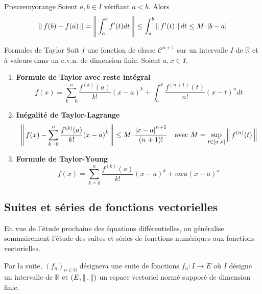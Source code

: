     \begin{demo}{Preuve}{myorange}
        Soient $a,b \in I$ vérifiant $a < b$. Alors 
        \[ \left\lVert\,f(b) - f(a)\,\right\rVert = \left\lVert\,\int_{a}^{b} f'(t)dt\,\right\rVert \leq \int_{a}^{b} \left\lVert\,f'(t)\,\right\rVert dt \leq M \cdotp \left\lvert b-a\right\rvert \]
    \end{demo}

    \begin{theo}{Formules de Taylor}{}
        Soit $f$ une fonction de classe $\mathcal{C}^{n+1}$ sur un intervalle $I$ de $\mathbb{R}$ et à valeurs dans un e.v.n. de dimension finie. Soient $a, x \in I$.
        \begin{enumerate}
            \item \textbf{Formule de Taylor avec reste intégral}
            \[ f(x) = \sum_{k=0}^{n} \frac{f^{(k)}(a)}{k!}(x-a)^k + \int_{a}^{x} \frac{f^{(n+1)}(t)}{n!} (x-t)^n dt \]
            \item \textbf{Inégalité de Taylor-Lagrange}
            \[ \left\lVert\,f(x) - \sum_{k=0}^{n} \frac{f^{(k)}(a)}{k!}(x-a)^k\,\right\rVert \leq M \cdotp \frac{\left\lvert x-a\right\rvert^{n+1}}{(n+1)!} \quad \text{avec } M = \sup_{t \in \left[ a \, , b \right]} \left\lVert\,f^{(n)}(t)\,\right\rVert \]
            \item \textbf{Formule de Taylor-Young}
            \[ f(x) = \sum_{k=0}^{n} \frac{f^{(k)}(a)}{k!}(x-a)^k + \comp{o}{x}{a}{(x-a)^n} \]
        \end{enumerate}
    \end{theo}

\subsection{Suites et séries de fonctions vectorielles}

    En vue de l’étude prochaine des équations différentielles, on généralise sommairement l’étude des suites et séries de fonctions numériques aux fonctions vectorielles.

    Par la suite, $(f_n)_{n \in \mathbb{N}}$ désignera une suite de fonctions $f_n : I \to E$ où $I$ désigne un intervalle de $\mathbb{R}$ et $(E,\left\lVert\,.\,\right\rVert)$ un espace vectoriel normé supposé de dimension finie.


